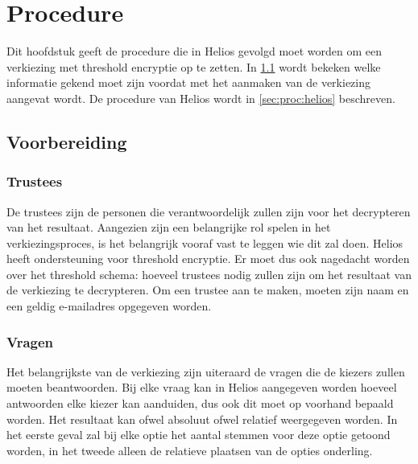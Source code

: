 % 
%

\chapter{Procedure}
\label{chap:procedure}

Dit hoofdstuk geeft de procedure die in Helios gevolgd moet worden om een verkiezing met threshold encryptie op te zetten. In \ref{sec:proc:voorbereiding} wordt bekeken welke informatie gekend moet zijn voordat met het aanmaken van de verkiezing aangevat wordt. De procedure van Helios wordt in \ref{sec:proc:helios} beschreven.

\section{Voorbereiding}
\label{sec:proc:voorbereiding}

\subsection{Trustees}


De trustees zijn de personen die verantwoordelijk zullen zijn voor het decrypteren van het resultaat. Aangezien zijn een belangrijke rol spelen in het verkiezingsproces, is het belangrijk vooraf vast te leggen wie dit zal doen. Helios heeft ondersteuning voor threshold encryptie. Er moet dus ook nagedacht worden over het threshold schema: hoeveel trustees nodig zullen zijn om het resultaat van de verkiezing te decrypteren. Om een trustee aan te maken, moeten zijn naam en een geldig e-mailadres opgegeven worden.

\subsection{Vragen}
\label{sec:proc:voorbereiding:vragen}

Het belangrijkste van de verkiezing zijn uiteraard de vragen die de kiezers zullen moeten beantwoorden. Bij elke vraag kan in Helios aangegeven worden hoeveel antwoorden elke kiezer kan aanduiden, dus ook dit moet op voorhand bepaald worden. Het resultaat kan ofwel absoluut ofwel relatief weergegeven worden. In het eerste geval zal bij elke optie het aantal stemmen voor deze optie getoond worden, in het tweede alleen de relatieve plaatsen van de opties onderling.

